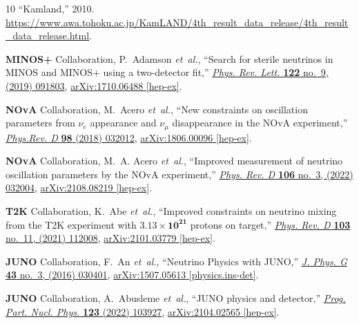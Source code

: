 \documentclass[aps, prd, onecolumn, tightenlines, notitlepage, superscriptaddress, nofootinbib, preprintnumbers, floatfix,showkeys,11pt]{revtex4-2}
\begin{document}
\begin{thebibliography}{10}
``Kamland,'' 2010.
\newblock
  \url{https://www.awa.tohoku.ac.jp/KamLAND/4th_result_data_release/4th_result_data_release.html}.

{\bfseries MINOS+} Collaboration, P.~Adamson {\em et~al.}, ``{Search for
  sterile neutrinos in MINOS and MINOS+ using a two-detector fit},''
  \href{http://dx.doi.org/10.1103/PhysRevLett.122.091803}{{\em Phys. Rev.
  Lett.} {\bfseries 122} no.~9, (2019) 091803},
  \href{http://arxiv.org/abs/1710.06488}{{\ttfamily arXiv:1710.06488
  [hep-ex]}}.

{\bfseries NOvA} Collaboration, M.~Acero {\em et~al.}, ``{New constraints on
  oscillation parameters from $\nu_e$ appearance and $\nu_\mu$ disappearance in
  the NOvA experiment},''
  \href{http://dx.doi.org/10.1103/PhysRevD.98.032012}{{\em Phys.Rev. D}
  {\bfseries 98} (2018) 032012},
  \href{http://arxiv.org/abs/1806.00096}{{\ttfamily arXiv:1806.00096
  [hep-ex]}}.

{\bfseries NOvA} Collaboration, M.~A. Acero {\em et~al.}, ``{Improved
  measurement of neutrino oscillation parameters by the NOvA experiment},''
  \href{http://dx.doi.org/10.1103/PhysRevD.106.032004}{{\em Phys. Rev. D}
  {\bfseries 106} no.~3, (2022) 032004},
  \href{http://arxiv.org/abs/2108.08219}{{\ttfamily arXiv:2108.08219
  [hep-ex]}}.

{\bfseries T2K} Collaboration, K.~Abe {\em et~al.}, ``{Improved constraints on
  neutrino mixing from the T2K experiment with $\mathbf{3.13\times10^{21}}$
  protons on target},''
  \href{http://dx.doi.org/10.1103/PhysRevD.103.112008}{{\em Phys. Rev. D}
  {\bfseries 103} no.~11, (2021) 112008},
  \href{http://arxiv.org/abs/2101.03779}{{\ttfamily arXiv:2101.03779
  [hep-ex]}}.

{\bfseries JUNO} Collaboration, F.~An {\em et~al.}, ``{Neutrino Physics with
  JUNO},'' \href{http://dx.doi.org/10.1088/0954-3899/43/3/030401}{{\em J. Phys.
  G} {\bfseries 43} no.~3, (2016) 030401},
  \href{http://arxiv.org/abs/1507.05613}{{\ttfamily arXiv:1507.05613
  [physics.ins-det]}}.

{\bfseries JUNO} Collaboration, A.~Abusleme {\em et~al.}, ``{JUNO physics and
  detector},'' \href{http://dx.doi.org/10.1016/j.ppnp.2021.103927}{{\em Prog.
  Part. Nucl. Phys.} {\bfseries 123} (2022) 103927},
  \href{http://arxiv.org/abs/2104.02565}{{\ttfamily arXiv:2104.02565
  [hep-ex]}}.


\end{thebibliography}
\end{document}
